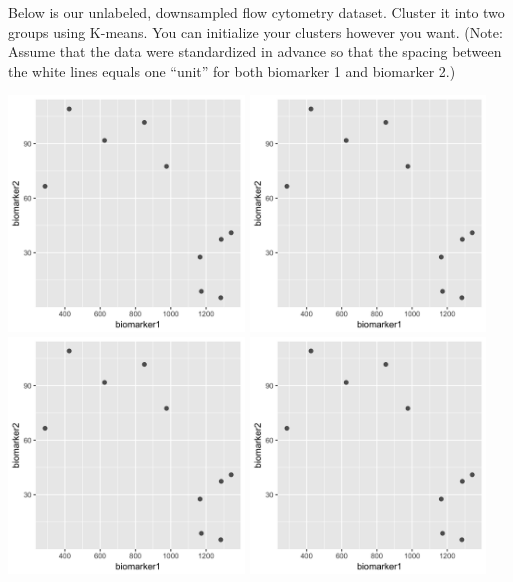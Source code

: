 \begin{question}{}
Below is our unlabeled, downsampled flow cytometry dataset. Cluster it into two groups using K-means. You can initialize your clusters however you want. (Note: Assume that the data were standardized in advance so that the spacing between the white lines equals one ``unit'' for both biomarker 1 and biomarker 2.)
\begin{center}
\includegraphics[width=0.47\textwidth]{img/biomarker-data-plain.png}
\includegraphics[width=0.47\textwidth]{img/biomarker-data-plain.png}
\includegraphics[width=0.47\textwidth]{img/biomarker-data-plain.png}
\includegraphics[width=0.47\textwidth]{img/biomarker-data-plain.png}

\end{center}
\end{question}

